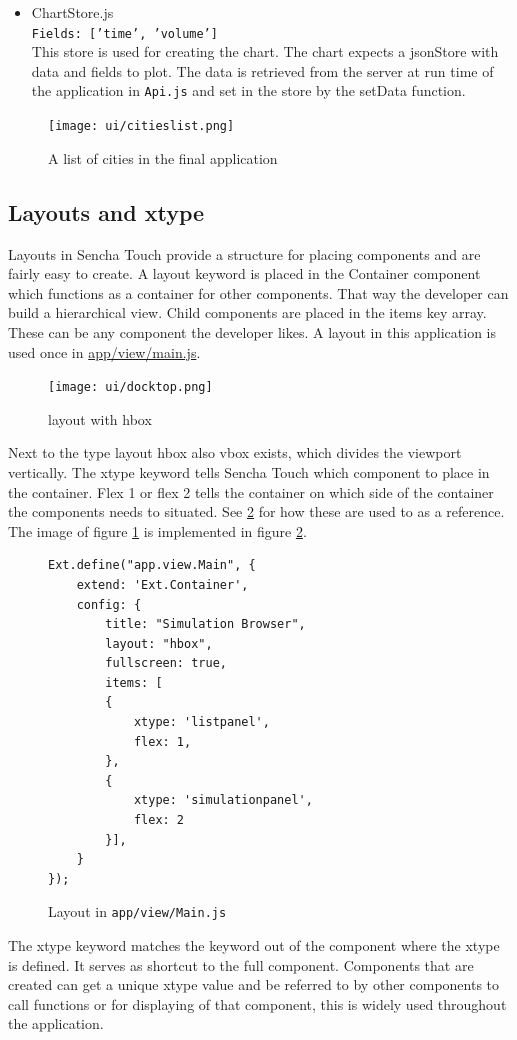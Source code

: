 \begin{itemize}
\item ChartStore.js \\
\texttt{Fields: ['time', 'volume']}\\
This store is used for creating the chart. The chart expects a jsonStore with data and fields to plot. The data is retrieved from the server at run time of the application in \texttt{Api.js} and set in the store by the setData function.
\end{itemize}

\begin{figure}[H]
\center
\texttt{[image: ui/citieslist.png]}
\caption{A list of cities in the final application}
\end{figure}


\subsection{Layouts and xtype}
Layouts in Sencha Touch provide a structure for placing components and are fairly easy to create. A layout keyword is placed in the Container component which functions as a container for other components. That way the developer can build a hierarchical view. Child components are placed in the items key array. These can be any component the developer likes. A layout in this application is used once in \url{app/view/main.js}. 

\begin{figure}[H]
\center
\texttt{[image: ui/docktop.png]}
\caption{layout with hbox}
\label{fig:layout}
\end{figure}

Next to the type layout hbox also vbox exists, which divides the viewport vertically.  The xtype keyword tells Sencha Touch which component to place in the container. Flex 1 or flex 2 tells the container on which side of the container the components needs to situated. See \ref{fig:layout_impl} for how these are used to as a reference. The image of figure \ref{fig:layout} is implemented in figure \ref{fig:layout_impl}.

\begin{figure}[H]
\begin{lstlisting}
Ext.define("app.view.Main", {
    extend: 'Ext.Container',
    config: {
        title: "Simulation Browser",
        layout: "hbox",
        fullscreen: true,
        items: [
        {
            xtype: 'listpanel',
            flex: 1,
        },
        {    
            xtype: 'simulationpanel',
            flex: 2
        }],
    }
});
\end{lstlisting}
\caption{Layout in \texttt{app/view/Main.js}}
\label{fig:layout_impl}
\end{figure}
The xtype keyword matches the keyword out of the component where the xtype is defined. It serves as shortcut to the full component. Components that are created can get a unique xtype value and be referred to by other components to call functions or for displaying  of that component, this is widely used throughout the application.
 

